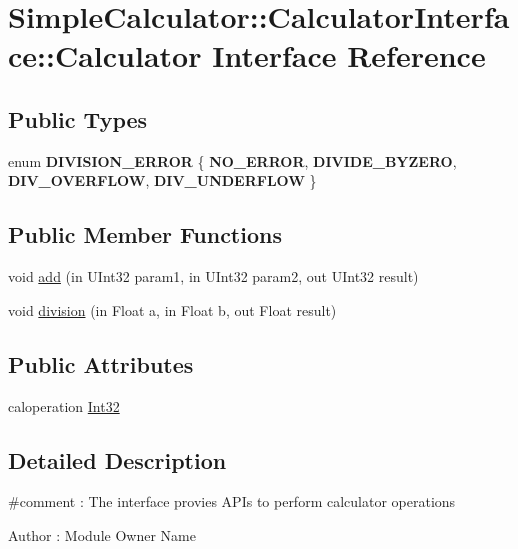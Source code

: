 \hypertarget{interfaceSimpleCalculator_1_1CalculatorInterface_1_1Calculator}{\section{Simple\-Calculator\-:\-:Calculator\-Interface\-:\-:Calculator Interface Reference}
\label{interfaceSimpleCalculator_1_1CalculatorInterface_1_1Calculator}
}
\subsection*{Public Types}
\begin{DoxyCompactItemize}
\item 
enum {\bfseries D\-I\-V\-I\-S\-I\-O\-N\-\_\-\-E\-R\-R\-O\-R} \{ {\bfseries N\-O\-\_\-\-E\-R\-R\-O\-R}, 
{\bfseries D\-I\-V\-I\-D\-E\-\_\-\-B\-Y\-Z\-E\-R\-O}, 
{\bfseries D\-I\-V\-\_\-\-O\-V\-E\-R\-F\-L\-O\-W}, 
{\bfseries D\-I\-V\-\_\-\-U\-N\-D\-E\-R\-F\-L\-O\-W}
 \}
\end{DoxyCompactItemize}
\subsection*{Public Member Functions}
\begin{DoxyCompactItemize}
\item 
void \hyperlink{interfaceSimpleCalculator_1_1CalculatorInterface_1_1Calculator_a24599dabbaf87824d61c3b8c18f57a43}{add} (in U\-Int32 param1, in U\-Int32 param2, out U\-Int32 result)
\item 
void \hyperlink{interfaceSimpleCalculator_1_1CalculatorInterface_1_1Calculator_a2e56668ac523140b600a8b2293da6274}{division} (in Float a, in Float b, out Float result)
\end{DoxyCompactItemize}
\subsection*{Public Attributes}
\begin{DoxyCompactItemize}
\item 
caloperation \hyperlink{interfaceSimpleCalculator_1_1CalculatorInterface_1_1Calculator_a6597107e705165bc1d27edd6c03210e4}{Int32}
\end{DoxyCompactItemize}


\subsection{Detailed Description}
\#comment \-: The interface provies A\-P\-Is to perform calculator operations\begin{DoxyAuthor}{Author}
\-: Module Owner Name 
\end{DoxyAuthor}


